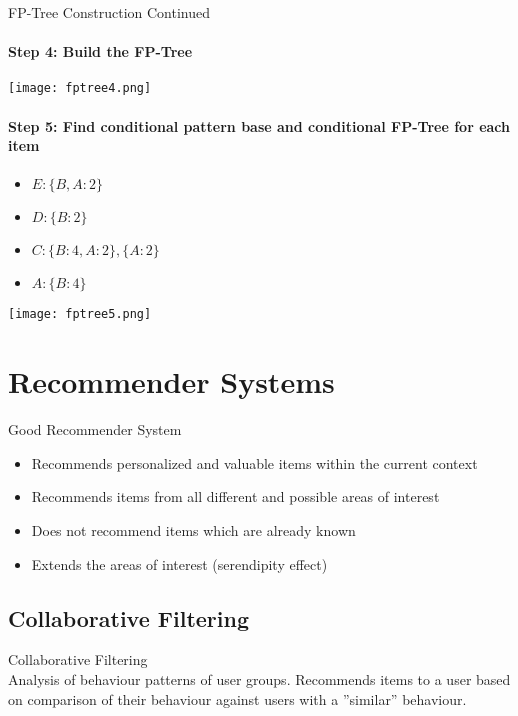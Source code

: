 \begin{KR}{FP-Tree Construction Continued}

\paragraph{Step 4: Build the FP-Tree}
\texttt{[image: fptree4.png]}

\paragraph{Step 5: Find conditional pattern base and conditional FP-Tree for each item}
\begin{itemize}
    \item $E: \{B, A: 2\}$
    \item $D: \{B: 2\}$
    \item $C: \{B: 4, A: 2\}, \{A: 2\}$
    \item $A: \{B: 4\}$
\end{itemize}
\texttt{[image: fptree5.png]}
\end{KR}

\raggedcolumns
\pagebreak


\section{Recommender Systems}

\begin{definition}{Good Recommender System}
\begin{itemize}
    \item Recommends personalized and valuable items within the current context
    \item Recommends items from all different and possible areas of interest
    \item Does not recommend items which are already known
    \item Extends the areas of interest (serendipity effect)
\end{itemize}
\end{definition}

\subsection{Collaborative Filtering}

\begin{concept}{Collaborative Filtering}\\
Analysis of behaviour patterns of user groups. Recommends items to a user based on comparison of their behaviour against users with a ''similar'' behaviour.
\end{concept}

